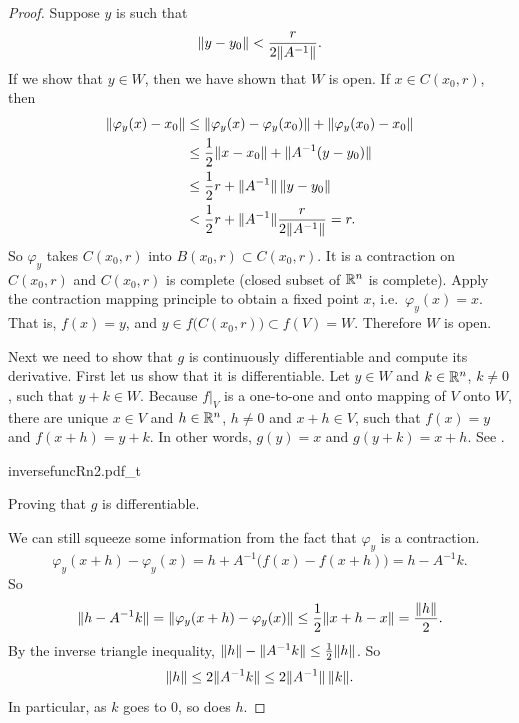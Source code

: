 \begin{proof}
Suppose $y$ is such that
\begin{equation*}
\lVert {y-y_0} \rVert <
\frac{r}{2\lVert {A^{-1}} \rVert} .
\end{equation*}
If we show that $y \in W$, then we have shown that $W$ is open.
If $x \in
C(x_0,r)$, then
\begin{equation*}
\begin{split}
\lVert {\varphi_y(x)-x_0} \rVert
& \leq
\lVert {\varphi_y(x)-\varphi_y(x_0)} \rVert +
\lVert {\varphi_y(x_0)-x_0} \rVert \\
& \leq
\frac{1}{2}\lVert {x-x_0} \rVert +
\lVert {A^{-1}(y-y_0)} \rVert \\
& \leq
\frac{1}{2}r +
\lVert {A^{-1}} \rVert \, \lVert {y-y_0} \rVert \\
& <
\frac{1}{2}r +
\lVert {A^{-1}} \rVert
\frac{r}{2\lVert {A^{-1}} \rVert} = r .
\end{split}
\end{equation*}
So $\varphi_y$ takes $C(x_0,r)$ into $B(x_0,r) \subset C(x_0,r)$.  It is a
contraction on $C(x_0,r)$ and $C(x_0,r)$ is complete (closed subset of ${\mathbb{R}}^n$
is complete).
Apply the contraction mapping principle to obtain a fixed point $x$,
i.e.\ $\varphi_y(x) = x$.  That is, $f(x) = y$, and $y \in
f\bigl(C(x_0,r)\bigr) \subset f(V) = W$.  Therefore $W$ is open.

Next we need to show that $g$ is continuously differentiable and compute
its derivative.  First let us show that it is differentiable.
Let $y \in W$ and $k \in {\mathbb{R}}^n$, $k\not= 0$, such that $y+k \in W$.
Because $f|_V$ is a one-to-one and onto mapping of $V$ onto $W$,
there are unique
$x \in V$ and $h \in {\mathbb{R}}^n$, $h \not= 0$ and $x+h \in V$, such that
$f(x) = y$ and $f(x+h) = y+k$.
In other words, $g(y) = x$ and $g(y+k) = x+h$.  See
.
\begin{myfigureht}
{inversefuncRn2.pdf_t}
\caption{Proving that $g$ is differentiable.\label{fig:inversefuncRn2}}
\end{myfigureht}

We can still
squeeze some information from the fact that $\varphi_y$ is a contraction.
\begin{equation*}
\varphi_y(x+h)-\varphi_y(x) = h + A^{-1} \bigl( f(x)-f(x+h) \bigr) = h - A^{-1} k .
\end{equation*}
So
\begin{equation*}
\lVert {h-A^{-1}k} \rVert = \lVert {\varphi_y(x+h)-\varphi_y(x)} \rVert \leq
\frac{1}{2}\lVert {x+h-x} \rVert = \frac{\lVert {h} \rVert}{2}.
\end{equation*}
By the inverse triangle inequality, $\lVert {h} \rVert - \lVert {A^{-1}k} \rVert \leq
\frac{1}{2}\lVert {h} \rVert$.
So
\begin{equation*}
\lVert {h} \rVert \leq 2 \lVert {A^{-1}k} \rVert \leq 2 \lVert {A^{-1}} \rVert \, \lVert {k} \rVert.
\end{equation*}
In particular, as $k$ goes to 0, so does $h$.


\end{proof}
